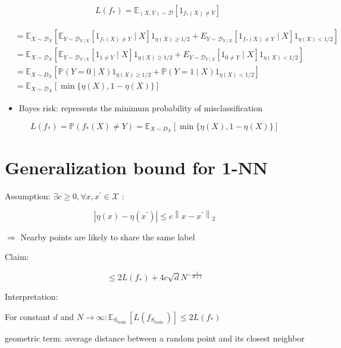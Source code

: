$$
\begin{aligned}
& L\left(f_{*}\right)=\mathbb{E}_{(X, Y) \sim \mathscr{D}}\left[1_{f_{*}(X) \neq Y}\right]
\end{aligned}
$$


$$
\begin{aligned}
& =\mathbb{E}_{X \sim \mathscr{D}_{X}}\left[\mathbb{E}_{Y \sim \mathscr{D}_{Y \mid X}}\left[1_{f_{*}(X) \neq Y} \mid X\right] 1_{\eta(X) \geq 1 / 2}+E_{Y \sim \mathscr{D}_{Y \mid X}}\left[1_{f_{*}(X) \neq Y} \mid X\right] 1_{\eta(X)<1 / 2}\right] \\
& =\mathbb{E}_{X \sim \mathscr{D}_{X}}\left[\mathbb{E}_{Y \sim \mathscr{D}_{Y \mid X}}\left[1_{1 \neq Y} \mid X\right] 1_{\eta(X) \geq 1 / 2}+E_{Y \sim \mathscr{D}_{Y \mid X}}\left[1_{0 \neq Y} \mid X\right] 1_{\eta(X)<1 / 2}\right] \\
& =\mathbb{E}_{X \sim D_{X}}\left[\mathbb{P}(Y=0 \mid X) 1_{\eta(X) \geq 1 / 2}+\mathbb{P}(Y=1 \mid X) 1_{\eta(X)<1 / 2}\right] \\
& =\mathbb{E}_{X \sim \mathscr{D}_{X}}[\min \{\eta(X), 1-\eta(X)\}]
\end{aligned}
$$

\begin{itemize}
  \item Bayes risk: represents the minimum probability of misclassification
\end{itemize}

$$
L\left(f_{*}\right)=\mathbb{P}\left(f_{*}(X) \neq Y\right)=\mathbb{E}_{X \sim D_{X}}[\min \{\eta(X), 1-\eta(X)\}]
$$

\section*{Generalization bound for 1-NN}
Assumption: $\exists c \geq 0, \forall x, x^{\prime} \in \mathscr{X}$ :

$$
\left|\eta(x)-\eta\left(x^{\prime}\right)\right| \leq c\left\|x-x^{\prime}\right\|_{2}
$$

$\Rightarrow$ Nearby points are likely to share the same label

Claim:

$$
\leq 2 L\left(f_{*}\right)+4 c \sqrt{d} N^{-\frac{1}{d+1}}
$$


Interpretation:

For constant $d$ and $N \rightarrow \infty: \mathbb{E}_{S_{\text {train }}}\left[L\left(f_{S_{\text {train }}}\right)\right] \leq 2 L\left(f_{*}\right)$

geometric term: average distance between a random point and its closest neighbor

